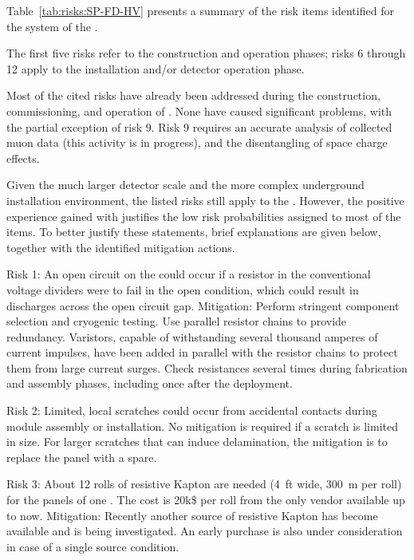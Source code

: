 Table~\ref{tab:risks:SP-FD-HV} presents a summary of the risk items identified for the  system of  the  . 



The first five risks refer to the construction and operation phases; risks 6 through 12  apply to the installation  and/or  detector operation phase. 

Most of the cited risks have already been addressed during the construction, commissioning, and operation of . 
None have caused significant problems, with the partial exception of risk 9. %
Risk 9 requires an accurate analysis of collected muon data (this activity is in progress), and the disentangling of space charge effects. 


Given the much larger detector scale and the more complex underground installation environment, the listed risks still %
apply to the . However, the positive experience gained with  justifies the low risk probabilities assigned to most of the items.  To better justify these statements, brief explanations are given below, together with the identified mitigation actions.

Risk 1: An open circuit on the  could occur if a resistor in the conventional voltage dividers were to fail in the open condition, which %
could result in  discharges across the open circuit gap. Mitigation: Perform stringent component selection and cryogenic testing. Use parallel resistor chains to provide redundancy. Varistors, capable of withstanding several thousand amperes of current impulses, have been added in parallel with the resistor chains to protect them from large current surges. Check resistances %
several times during  fabrication and assembly phases, including once after the  deployment.   

Risk 2: Limited, local scratches could %
occur from accidental contacts during module assembly or installation. No mitigation is required if a scratch is limited in size. For larger scratches that can induce delamination, the mitigation is to replace the panel with a spare. 

Risk 3: About 12 rolls of resistive Kapton are needed (\SI{4}{ft} wide, \SI{300}{m} per roll)  for the  panels of one .  The cost is 20k\$ per roll from the only vendor available up to now. Mitigation: Recently another source of resistive Kapton has become available and is being investigated. An early purchase is also under consideration in case of a single source condition.

